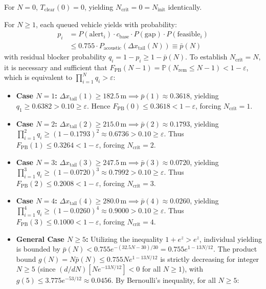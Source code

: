 \documentclass[journal,10pt,twocolumn]{IEEEtran}
\begin{document}
\begin{IEEEproof}
For $N = 0$, $T_{\text{clear}}(0) = 0$, yielding $N_{\text{crit}} = 0 = N_{\text{init}}$ identically. 

For $N \ge 1$, each queued vehicle yields with probability:
\begin{equation}
\begin{aligned}
p_i &= P(\text{alert}_i) \cdot c_{\text{base}} \cdot P(\text{gap}) \cdot P(\text{feasible}_i) \\[2pt]
&\le 0.755 \cdot P_{\text{acoustic}}(\Delta x_{\text{tail}}(N)) \equiv \bar{p}(N)
\end{aligned}
\end{equation}
with residual blocker probability $q_i = 1 - p_i \ge 1 - \bar{p}(N)$. To establish $N_{\text{crit}} = N$, it is necessary and sufficient that $F_{\text{PB}}(N - 1) = \mathbb{P}(N_{\text{rem}} \le N - 1) < 1 - \varepsilon$, which is equivalent to $\prod_{i=1}^N q_i > \varepsilon$:
\begin{itemize}\setlength{\itemsep}{4pt}
    \item \textbf{Case $N = 1$:} $\Delta x_{\text{tail}}(1) \ge 182.5\,\text{m} \implies \bar{p}(1) \approx 0.3618$, yielding $q_1 \ge 0.6382 > 0.10 \ge \varepsilon$. Hence $F_{\text{PB}}(0) \le 0.3618 < 1 - \varepsilon$, forcing $N_{\text{crit}} = 1$.
    \item \textbf{Case $N = 2$:} $\Delta x_{\text{tail}}(2) \ge 215.0\,\text{m} \implies \bar{p}(2) \approx 0.1793$, yielding $\prod_{i=1}^2 q_i \ge (1 - 0.1793)^2 \approx 0.6736 > 0.10 \ge \varepsilon$. Thus $F_{\text{PB}}(1) \le 0.3264 < 1 - \varepsilon$, forcing $N_{\text{crit}} = 2$.
    \item \textbf{Case $N = 3$:} $\Delta x_{\text{tail}}(3) \ge 247.5\,\text{m} \implies \bar{p}(3) \approx 0.0720$, yielding $\prod_{i=1}^3 q_i \ge (1 - 0.0720)^3 \approx 0.7992 > 0.10 \ge \varepsilon$. Thus $F_{\text{PB}}(2) \le 0.2008 < 1 - \varepsilon$, forcing $N_{\text{crit}} = 3$.
    \item \textbf{Case $N = 4$:} $\Delta x_{\text{tail}}(4) \ge 280.0\,\text{m} \implies \bar{p}(4) \approx 0.0260$, yielding $\prod_{i=1}^4 q_i \ge (1 - 0.0260)^4 \approx 0.9000 > 0.10 \ge \varepsilon$. Thus $F_{\text{PB}}(3) \le 0.1000 < 1 - \varepsilon$, forcing $N_{\text{crit}} = 4$.
    \item \textbf{General Case $N \ge 5$:} Utilizing the inequality $1 + e^z > e^z$, individual yielding is bounded by $\bar{p}(N) < 0.755 e^{-(32.5 N - 30)/30} = 0.755 e^{1 - 13N/12}$. The product bound $g(N) = N \bar{p}(N) \le 0.755 N e^{1 - 13N/12}$ is strictly decreasing for integer $N \ge 5$ (since $(d/dN)[N e^{-13N/12}] < 0$ for all $N \ge 1$), with $g(5) \le 3.775 e^{-53/12} \approx 0.0456$. By Bernoulli's inequality, for all $N \ge 5$:

\end{itemize}
\end{IEEEproof}
\end{document}
